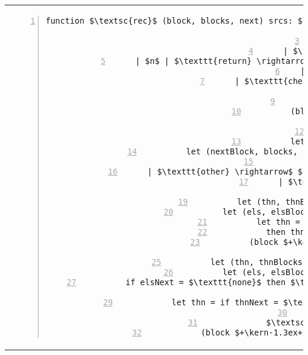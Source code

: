 \documentclass[runningheads]{llncs}
\newcommand\doubleplus{+\kern-1.3ex+}
\newcommand{\ttt}{\texttt}
\newcommand{\ra}{\rightarrow}
\newcommand{\stmt}{\textbf{\textsf{stmt}}}
\newcommand{\accty}{\textbf{\textsf{acc}}}
\begin{document}
\begin{algorithm}[tbp]
\begin{tabular}{c}
\begin{lstlisting}[style=alg,numbers=left]
function $\textsc{rec}$ (block, blocks, next) srcs: $\accty \ra [\stmt] \ra \accty$ =
  match srcs with
  | $[] \ra$ match next with
    | $\ttt{none} \ra$ (block, blocks, next)
    | $n$ | $\ttt{return} \ra$ (block $\doubleplus$ $[\ttt{jump} \textnormal{ next}]$, blocks, next)
  | src :: srcs $\ra$ match src with
    | $\ttt{checkpoint}$ | $\ttt{call}$ $\ra$ match srcs with
      | $[] \ra$
        let next = $\textsc{initNext}$ next in
        (block $\doubleplus$ $[$src next$]$, blocks, next)
      | _ ->
        let index = newIndex () in
        let block = block $\doubleplus$ $[$src index$]$ in
        let (nextBlock, blocks, next) = $\textsc{rec}$ ($[]$, blocks, $\textsc{initNext}$ next) srcs in
        (block, blocks $\cup$ (index, nextBlock), next)
    | $\ttt{other} \ra$ $\textsc{rec}$ (block $\doubleplus$ $[\ttt{other}]$, blocks, next) srcs
    | $\ttt{if}$ thn els $\ra$ match srcs with
      | $[] \rightarrow$
        let (thn, thnBlocks, thnNext) = $\textsc{rec}$ ($[]$, blocks, next) thn in
        let (els, elsBlocks, elsNext) = $\textsc{rec}$ ($[]$, thnBlocks, thnNext) els in
        let thn = if next $\neq$ elsNext $\land$ thnNext = $\ttt{none}$
          then thn $\doubleplus$ $[\ttt{jump}$ elsNext$]$ else thn in
        (block $\doubleplus$ $[\ttt{if}$ thn els$]$, elsBlocks, elsNext)
      | _ $\ra$
        let (thn, thnBlocks, thnNext) = $\textsc{rec}$ ($[]$, blocks, $\ttt{none}$) thn in
        let (els, elsBlocks, elsNext) = $\textsc{rec}$ ($[]$, thnBlocks, thnNext) els in
        if elsNext = $\ttt{none}$ then $\textsc{rec}$ (block $\doubleplus$ $[\ttt{if}$ thn els$]$, elsBlocks, next) srcs
        else
          let thn = if thnNext = $\ttt{none}$ then thn $\doubleplus$ $[\ttt{jump}$ elsNext$]$ else thn in
          let (nextBlock, blocks, next) =
            $\textsc{rec}$ ($[]$, elsBlocks, $\textsc{initNext}$ next) srcs in
          (block $\doubleplus$ $[\ttt{if}$ thn els$]$, blocks $\cup$ (elsNext, nextBlock), next)
    \end{lstlisting}
  \end{tabular}
  \ifthesis\vspace{-0.5mm}\fi
\end{algorithm}
\end{document}
